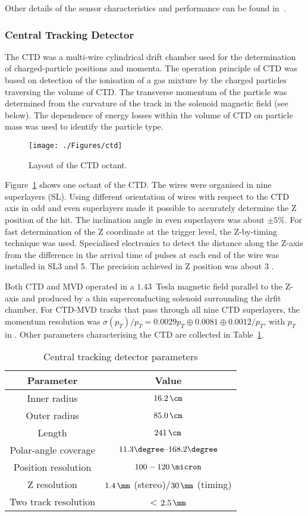 Other details of the sensor characteristics and performance can be found in~\cite{tech:mvd:prc9701}.

\subsubsection{Central Tracking Detector}
\label{subsubsec:ctd}
The CTD was a multi-wire cylindrical drift chamber used for the determination of charged-particle positions and momenta. The operation principle of CTD was based on detection of the ionisation of a gas mixture by the charged particles traversing the volume of CTD. The transverse momentum of the particle was determined from the curvature of the track in the solenoid magnetic field (see below). The dependence of energy losses within the volume of CTD on particle mass was used to identify the particle type.
\begin{figure}[htpb]
	\centering
		\texttt{[image: ./Figures/ctd]}
	\caption{Layout of the CTD octant.}
	\label{fig:ctd}
\end{figure}
Figure~\ref{fig:ctd} shows one octant of the CTD. The wires were organised in nine superlayers (SL). Using different orientation of wires with respect to the CTD axis in odd and even superlayers made it possible to accurately determine the Z position of the hit. The inclination angle in even superlayers was about $\pm 5\%$. For fast determination of the Z coordinate at the trigger level, the Z-by-timing technique was used. Specialised electronics to detect the distance along the Z-axis from the difference in the arrival time of pulses at each end of the wire was installed in SL3 and 5. The precision achieved in Z position was about 3 \cm.

Both CTD and MVD operated in a $1.43$~Tesla magnetic field parallel to the Z-axis and produced by a thin superconducting solenoid surrounding the drfit chamber. For CTD-MVD tracks that pass through all nine CTD superlayers, the momentum resolution was $\sigma(p_{T})/p_{T} = 0.0029 p_{T} \oplus 0.0081 \oplus
0.0012/p_{T}$, with $p_{T}$ in \GeV. Other parameters characterising the CTD are collected in Table~\ref{tab:ctdgeomparameters}.

\begin{table}[htbp]
	\centering
\begin{tabular}{ | c | c | }
     \hline
      Parameter & Value \\
			\hline
			\hline
			Inner radius & $16.2\,\cm$ \\ \hline
      Outer radius & $85.0\,\cm$  \\ \hline
			Length & $241\,\cm$ \\ \hline 
			Polar-angle coverage & $11.3\degree \mbox{--} 168.2\degree$ \\ \hline
			Position resolution & $100-120\,\micron$ \\ \hline
			Z resolution & $1.4\,\mm$ (stereo)/$30\,\mm$ (timing) \\ \hline
			Two track resolution & < $2.5\,\mm$ \\
      \hline
     \end{tabular}
	\caption{Central tracking detector parameters}
	\label{tab:ctdgeomparameters}
\end{table}
